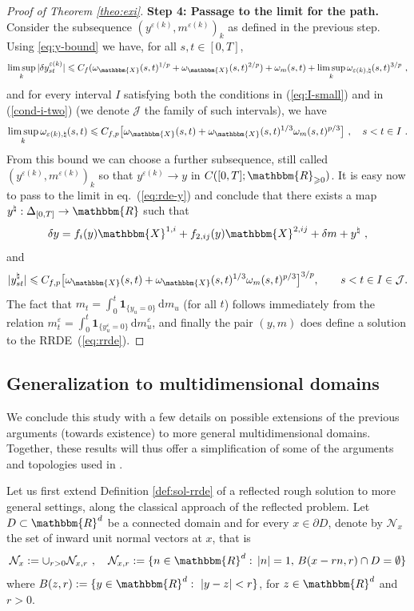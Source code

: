 \documentclass[11pt,reqno,oneside]{amsart}
\numberwithin{equation}{section}
\newcommand{\assign}{:=}
\newcommand{\mathd}{\mathrm{d}}
\newcommand{\tmtextbf}[1]{{\bfseries{#1}}}
\newcommand{\ep}{\varepsilon}
\begin{document}
\begin{proof}[Proof of Theorem \ref{theo:exi}]
  {\noindent}\tmtextbf{Step 4: Passage to the limit for the path.} Consider
  the subsequence $(y^{\varepsilon (k)}, m^{\varepsilon (k)})_k$ as defined in
  the previous step. Using \eqref{eq:y-bound} we have, for all $s, t \in [0, T]$,
  \[ \limsup_k | \delta y^{\varepsilon (k)}_{s t} | \leqslant C_f
     (\omega_{\mathbbm{X}} (s, t)^{1 / p} + \omega_{\mathbbm{X}} (s, t)^{2 /
     p}) + \omega_m (s, t) + \limsup_k \omega_{\varepsilon (k), \natural} (s,
     t)^{3 / p}\ ,\]
  and for every interval $I$ satisfying both the conditions in (\ref{eq:I-small}) and in (\ref{cond-i-two}) (we
  denote $\mathcal{J}$ the family of such intervals), we have
 $$\limsup_k \omega_{\varepsilon (k), \natural} (s, t)\leqslant  C_{f,p} \big[ \omega_{\mathbbm{X}} (s, t) + \omega_{\mathbbm{X}}
     (s, t)^{1 / 3}\omega_m (s, t)^{p/3}\big]\ ,
     \quad s< t \in I  \ .$$
  From this bound we can choose a further subsequence, still called
  $(y^{\varepsilon (k)}, m^{\varepsilon (k)})_k$ so that $y^{\varepsilon (k)}
  \rightarrow y$ in $C ([0, T];\mathbbm{R}_{\geqslant 0})$. It is easy now to pass to the limit in eq.~(\ref{eq:rde-y}) and
  conclude that there exists a map $y^\natural :\Delta_{[0,T]} \to \mathbbm{R}$ such that
  \[ \delta y = f_i (y) \mathbbm{X}^{1,i} + f_{2,ij} (y) \mathbbm{X}^{2,ij} + \delta m +
     y^{\natural} \ , \]
 and
  \[ |  y^{\natural}_{s t} | \leqslant C_{f,p} \big[ \omega_{\mathbbm{X}} (s, t) + \omega_{\mathbbm{X}}
     (s, t)^{1 / 3}\omega_m (s, t)^{p/3}\big]^{3 / p},
     \qquad s< t \in I \in \mathcal{J}. \]
The fact that $m_t=\int_0^t \mathbf{1}_{\{y_u=0\}} \, \mathd m_u$ (for all $t$) follows immediately from the relation $m^\ep_t=\int_0^t \mathbf{1}_{\{y^\ep_u=0\}} \, \mathd m^\ep_u$, and finally the pair $(y,m)$ does define a solution to the RRDE~(\ref{eq:rrde}).
\end{proof}

\smallskip


\subsection{Generalization to multidimensional domains}\label{subsec:general-existence}
We conclude this study with a few details on possible extensions of the previous arguments (towards existence) to more general multidimensional domains. Together, these results will thus offer a simplification of some of the arguments and topologies used in \cite{aida_reflected_2015,aida-2016}.

\smallskip

Let us first extend Definition \ref{def:sol-rrde} of a reflected rough solution to more general settings, along the classical approach of the reflected problem. Let $D \subset \mathbbm{R}^d$ be a connected domain and for every $x\in \partial D$, denote by $\mathcal{N}_x$ the set of
inward unit normal vectors at $x$, that is 
$$\mathcal{N}_x \assign \cup_{r>0} \mathcal{N}_{x,r} \  , \quad \mathcal{N}_{x,r} \assign
\{
n \in \mathbbm{R}^d: \,  |n| = 1, \, B(x-rn,r) \cap D = \emptyset
\}$$
where $B(z,r)\assign \{y \in  \mathbbm{R}^d: \ |y-z| < r\}$, for $z\in \mathbbm{R}^d$ and $r > 0$. 
\end{document}
